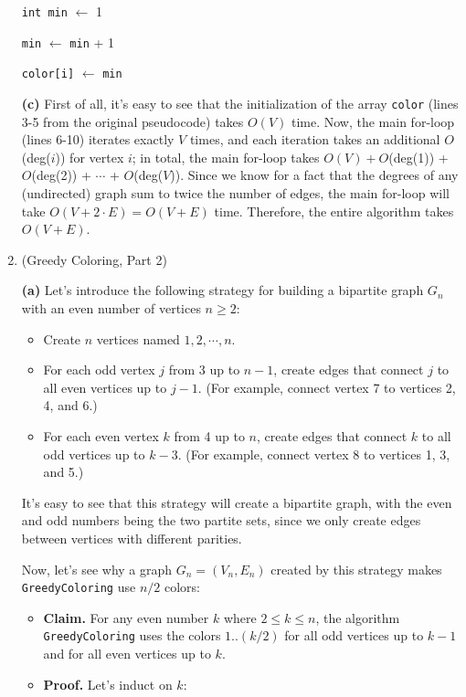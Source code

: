 \documentclass{article}
\begin{document}
\begin{enumerate}
\begin{center}
\begin{minipage}{0.5625\linewidth}
\begin{algorithm}[H]
{            {\tt int min} $\gets$ 1

            {
              {\tt min} $\gets$ {\tt min} + 1
            }

            {\tt color[i]} $\gets$ {\tt min}
          }

        \end{algorithm}
      \end{minipage}
    \end{center}

    \textbf{(c)} First of all, it's easy to see that the initialization of the array \texttt{color} (lines 3-5 from the original pseudocode) takes $O(V)$ time. Now, the main for-loop (lines 6-10) iterates exactly $V$ times, and each iteration takes an additional $O$(deg($i$)) for vertex $i$; in total, the main for-loop takes $O(V) + O$(deg(1)) + $O$(deg(2)) + $\cdots$ + $O$(deg($V$)). Since we know for a fact that the degrees of any (undirected) graph sum to twice the number of edges, the main for-loop will take $O(V + 2 \cdot E) = O(V + E)$ time. Therefore, the entire algorithm takes $O(V + E)$.

    \pagebreak

  \item (Greedy Coloring, Part 2)

    \textbf{(a)} Let's introduce the following strategy for building a bipartite graph $G_n$ with an even number of vertices $n \ge 2$:
    \begin{itemize}
      \item Create $n$ vertices named $1, 2, \cdots, n$.
      \item For each odd vertex $j$ from 3 up to $n - 1$, create edges that connect $j$ to all even vertices up to $j - 1$. (For example, connect vertex 7 to vertices 2, 4, and 6.)
      \item For each even vertex $k$ from 4 up to $n$, create edges that connect $k$ to all odd vertices up to $k - 3$. (For example, connect vertex 8 to vertices 1, 3, and 5.)
    \end{itemize}
    It's easy to see that this strategy will create a bipartite graph, with the even and odd numbers being the two partite sets, since we only create edges between vertices with different parities.

    Now, let's see why a graph $G_n = (V_n, E_n)$ created by this strategy makes \texttt{GreedyColoring} use $n/2$ colors:
    \begin{itemize}
      \item \textbf{Claim.} For any even number $k$ where $2 \le k \le n$, the algorithm \texttt{GreedyColoring} uses the colors $1..(k/2)$ for all odd vertices up to $k-1$ and for all even vertices up to $k$.
      \item \textbf{Proof.} Let's induct on $k$:


\end{itemize}
\end{enumerate}
\end{document}
